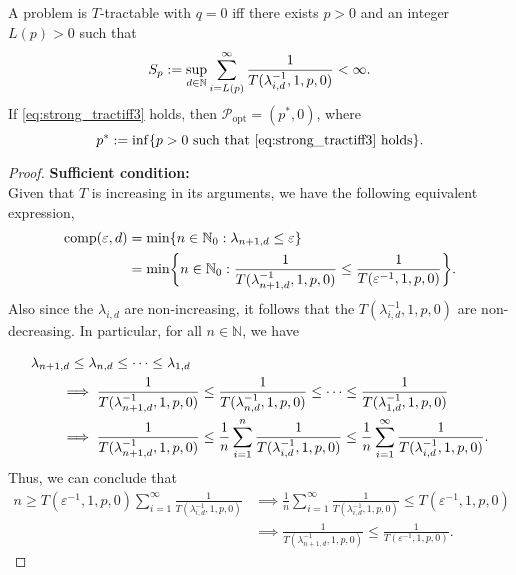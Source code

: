 \documentclass[11pt,a4paper]{article}
\begin{document}
\begin{theorem}\label{thm_main_strong_tract2}
A problem is $T$-tractable with $q=0$ iff there exists $p>0$ and an integer $L(p) > 0$ such that
\begin{equation} \label{eq:strong_tractiff3}
     S_p:=\sup_{d \in \mathbb{N}} \sum_{i = L(p)}^\infty \frac{1}{T(\lambda_{i,d}^{-1},1,p,0)} < \infty.
\end{equation}
If \eqref{eq:strong_tractiff3} holds, then $\mathcal{P}_{\text{opt}}=(p^*,0)$, where
\[
 p^* := \inf\{p>0\ \mbox{such that \eqref{eq:strong_tractiff3} holds}\}.
\]
\end{theorem}
\begin{proof}
\textbf{Sufficient condition:}\\
Given that $T$ is increasing in its arguments, we have the following equivalent expression,
    \begin{align*}
    \operatorname{comp}(\varepsilon, d) &= \min \{n \in \mathbb{N}_{0} : \lambda_{n+1, d} \le \varepsilon\} \\
    &= \min \biggl\{n \in \mathbb{N}_{0} : \frac{1}{T(\lambda_{n+1,d}^{-1},1,p,0)}\le \frac{1}{T(\varepsilon^{-1},1,p,0) }\biggr\}.
\end{align*}
Also since the $\lambda_{i,d}$ are non-increasing, it follows that the $T(\lambda_{i,d}^{-1},1,p,0)$ are non-decreasing. In particular, for all $n\in \mathbb{N}$, we have

\begin{align*}
    \MoveEqLeft{\lambda_{n+1,d} \le \lambda_{n,d} \le \cdots \le \lambda_{1,d}} \\
    & \implies \frac{1}{T(\lambda_{n+1, d}^{-1},1,p,0)} \le \frac{1}{T(\lambda_{n, d}^{-1},1,p,0)} \le \cdots \le \frac{1}{T(\lambda_{1, d}^{-1},1,p,0)} \\
    & \implies \frac{1}{T(\lambda_{n+1, d}^{-1},1,p,0) }
    \le \frac 1n \sum_{i=1}^n  \frac{1}{T(\lambda_{i, d}^{-1},1,p,0) }
    \le \frac 1n \sum_{i=1}^\infty  \frac{1}{T(\lambda_{i, d}^{-1},1,p,0)}.
\end{align*}
Thus, we can conclude that
\begin{align*}
    n \ge T(\varepsilon^{-1},1,p,0) \sum_{i=1}^\infty \frac{1}{T(\lambda_{i, d}^{-1},1,p,0)}
    & \implies
\frac 1n \sum_{i=1}^\infty \frac{1}{T(\lambda_{i, d}^{-1},1,p,0) }\le  T(\varepsilon^{-1},1,p,0) \\
   & \implies   \frac{1}{T(\lambda_{n+1, d}^{-1},1,p,0)} \le \frac{1}{T(\varepsilon^{-1},1,p,0)}.
\end{align*}


\end{proof}
\end{document}
